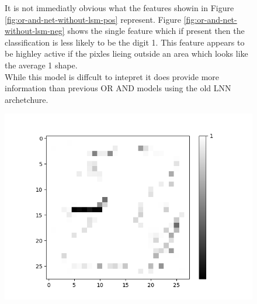 \begin{figure}[H]
	\begin{minipage}[t]{0.44\textwidth}
		\vspace{0cm}
		It is not immediatly obvious what the features showin in Figure \ref{fig:or-and-net-without-lsm-pos} represent. Figure \ref{fig:or-and-net-without-lsm-neg} shows the single feature which if present then the classification is less likely to be the digit 1. This feature appears to be highley active if the pixles lieing outside an area which looks like the average 1 shape.\\

		While this model is diffcult to intepret it does provide more information than previous OR AND models using the old LNN archetchure.
	\end{minipage}
	\hspace{1cm}
	\begin{minipage}[t]{0.49\textwidth}
	\vspace{0cm}
	\centering
	\begin{minipage}[b]{0.49\textwidth}
		\captionsetup{labelformat=empty}
		\includegraphics[width=\textwidth]{OR-AND(WO-LSM)(1)/DontLike/True/Layer0-Neuron-28.png}
		\label{}
	\end{minipage}

	\medskip


\end{minipage}
\end{figure}
